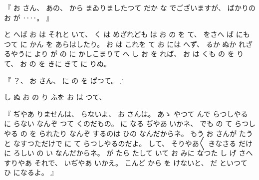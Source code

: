 %
『
お
さん、
%
あの、
%
から
まゐりましたつて
だか
な
でございますが、
%
ばかりの
お
が
‥‥。
』

%
と
へば
お
は
それと
いて、
%
く
は
めざれども
は
お
の
を
て、
%
をさへ
ば
にも
つて
に
かん
を
あらはしたり。
%
お
は
これを
て
お
には
へず、
%
るか
ぬか
%
れざるやうに
より
が
の
に
かしこまりて
へ
し
お
を
れば、
%
お
は
くも
の
を
りて、
%
お
の
を
きに
きて
に
りぬ。

%
『
？、
%
お
さん、
%
に
の
を
ぱつて。
』

%
し
ぬ
お
の
り
ふを
お
は
つて、

%
『
ぢやあ
りませんは、
%
らないよ、
%
お
さんは。
%
あゝ
やつて
んで
らつしやる
に
らない
なんぞ
つて
くのだもの。
%
に
なる
ぢやあ
いかネ、
%
でも
の%
て
らつしやる
の
を
られたり
なんぞ
するのは
ひの
なんだからネ。
%
もう
お
さんが
たうと
なすつただけで%
に
%
て
らつしやるのだよ。
%
して、
%
そりやあ〳〵
きなさる%
だけに
ろしい
の
い
なんだからネ。
%
が
たら
たして
いて
お
みに
なつた
し
げ
さへ
すりやあ
それで、
%
いぢやあ
いかえ。
%
こんど
から
を
けないと、
%
だ
といつて
ひ
になるよ。
』


